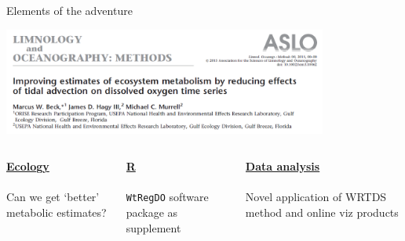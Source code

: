 \documentclass[serif]{beamer}\usepackage[]{graphicx}\usepackage[]{color}
\begin{document}
\begin{frame}[t]{Elements of the adventure}
\centerline{\includegraphics[width = 0.8\textwidth]{fig/lopaper.png}} 
\vspace{0.1in}
\begin{columns}[T]
  \begin{column}{0.3\textwidth}
    \textbf{\underline{Ecology}}\\~\\
    Can we get `better' metabolic estimates?
  \end{column}
  \begin{column}{0.3\textwidth}
    \textbf{\underline{R}}\\~\\
    \texttt{WtRegDO} software package as supplement
  \end{column}
  \begin{column}{0.3\textwidth}
    \textbf{\underline{Data analysis}}\\~\\
    Novel application of WRTDS method and online viz products
  \end{column}
\end{columns}
\end{frame}
\end{document}
